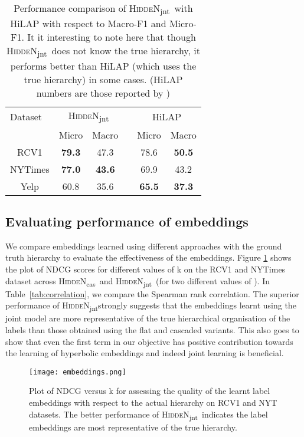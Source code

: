 \documentclass[11pt,a4paper]{article}
\newcommand{\modeljnt}{\mbox{\textsc{HiddeN}\textsubscript{jnt}}}
\newcommand{\modelcas}{\mbox{\textsc{HiddeN}\textsubscript{cas}}}
\begin{document}
\begin{table}[!h]
\centering
\caption{Performance comparison of \modeljnt\ with HiLAP with respect to Macro-F1 and Micro-F1. It it interesting to note here that though \modeljnt\ does not know the true hierarchy, it performs better than HiLAP (which uses the true hierarchy) in some cases. (HiLAP numbers are those reported by \citet{emnlp})}
\label{tab:hilap}
\begin{adjustbox}{max width=0.48\textwidth}
\begin{tabular}{ccclcc} 
\toprule
\multicolumn{1}{l}{Dataset} & \multicolumn{2}{c}{\modeljnt} &  & \multicolumn{2}{c}{HiLAP} \\ 
\cline{2-3}\cline{5-6}
\multicolumn{1}{l}{} & \multicolumn{1}{l}{Micro} & \multicolumn{1}{l}{Macro} &  & Micro & Macro \\ 
\toprule
RCV1 & \textbf{79.3} & 47.3 &  & 78.6 & \textbf{50.5} \\
NYTimes & \textbf{77.0} & \textbf{43.6} &  & 69.9 & 43.2 \\
Yelp & 60.8 & 35.6 &  & \textbf{65.5} & \textbf{37.3} \\
\bottomrule
\end{tabular}
\end{adjustbox}
\end{table}

\subsection{Evaluating performance of embeddings}
We compare embeddings learned using different approaches with the ground truth hierarchy to evaluate the effectiveness of the embeddings. Figure \ref{fig:embed} shows the plot of NDCG scores for different values of k on the RCV1 and NYTimes dataset across \modelcas\ and \modeljnt\ (for two different values of ). In Table~\ref{tab:correlation}, we compare the Spearman rank correlation. The superior performance of \modeljnt strongly suggests that the embeddings learnt using the joint model are more representative of the true hierarchical organisation of the labels than those obtained using the flat and cascaded variants. This also goes to show that even the first term in our objective has positive contribution towards the learning of hyperbolic embeddings and indeed joint learning is beneficial.

\begin{figure}[!h]
    \centering
    \texttt{[image: embeddings.png]}
    \caption{Plot of NDCG versus k for assessing the quality of the learnt label embeddings with respect to the actual hierarchy on RCV1 and NYT datasets. The better performance of \modeljnt\ indicates the label embeddings  are most representative of the true hierarchy.}
    \label{fig:embed}
\end{figure}
\end{document}

